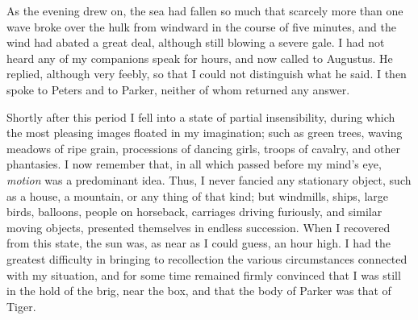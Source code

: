 As the evening drew on, the sea had fallen so much that scarcely more than
one wave broke over the hulk from windward in the course of five minutes, and
the wind had abated a great deal, although still blowing a severe gale. I had
not heard any of my companions speak for hours, and now called to Augustus. He
replied, although very feebly, so that I could not distinguish what he said. I
then spoke to Peters and to Parker, neither of whom returned any answer. 

Shortly after this period I fell into a state of partial insensibility,
during which the most pleasing images floated in my imagination; such as green
trees, waving meadows of ripe grain, processions of dancing girls, troops of
cavalry, and other phantasies. I now remember that, in all which passed before
my mind's eye, \emph{motion} was a predominant idea. Thus, I never fancied any
stationary object, such as a house, a mountain, or any thing of that kind; but
windmills, ships, large birds, balloons, people on horseback, carriages driving
furiously, and similar moving objects, presented themselves in endless
succession. When I recovered from this state, the sun was, as near as I could
guess, an hour high. I had the greatest difficulty in bringing to recollection
the various circumstances connected with my situation, and for some time
remained firmly convinced that I was still in the hold of the brig, near the
box, and that the body of Parker was that of Tiger. 

